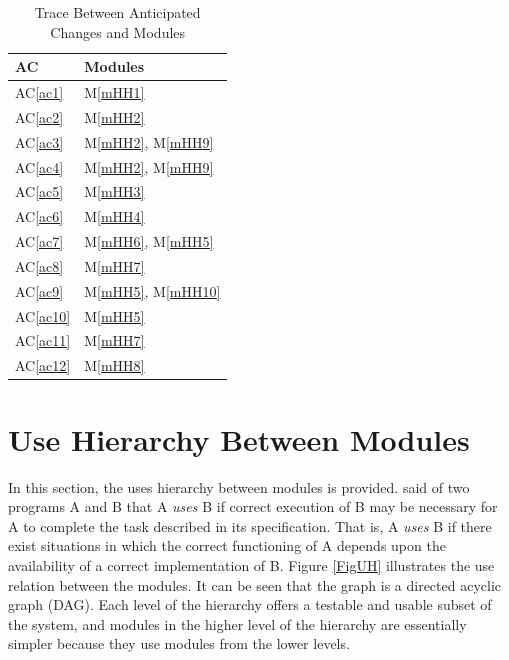 \documentclass[12pt, titlepage]{article}
\newcommand{\acref}[1]{AC\ref{#1}}
\newcommand{\mref}[1]{M\ref{#1}}
\begin{document}
\begin{table}[H]
  \centering
  \begin{tabular}{p{} p{}}
  \toprule
  \textbf{AC} & \textbf{Modules}\\
  \midrule
  \acref{ac1} & \mref{mHH1}\\
  \acref{ac2} & \mref{mHH2}\\
  \acref{ac3} & \mref{mHH2}, \mref{mHH9}\\
  \acref{ac4} & \mref{mHH2}, \mref{mHH9}\\
  \acref{ac5} & \mref{mHH3}\\
  \acref{ac6} & \mref{mHH4}\\
  \acref{ac7} & \mref{mHH6}, \mref{mHH5}\\
  \acref{ac8} & \mref{mHH7}\\
  \acref{ac9} & \mref{mHH5}, \mref{mHH10}\\
  \acref{ac10} & \mref{mHH5}\\
  \acref{ac11} & \mref{mHH7}\\
  \acref{ac12} & \mref{mHH8}\\
  \bottomrule
  \end{tabular}
  \caption{Trace Between Anticipated Changes and Modules}
  \label{TblACT}
  \end{table}
  

\section{Use Hierarchy Between Modules} \label{SecUse}

In this section, the uses hierarchy between modules is
provided. \citet{Parnas1978} said of two programs A and B that A {\em uses} B if
correct execution of B may be necessary for A to complete the task described in
its specification. That is, A {\em uses} B if there exist situations in which
the correct functioning of A depends upon the availability of a correct
implementation of B.  Figure \ref{FigUH} illustrates the use relation between
the modules. It can be seen that the graph is a directed acyclic graph
(DAG). Each level of the hierarchy offers a testable and usable subset of the
system, and modules in the higher level of the hierarchy are essentially simpler
because they use modules from the lower levels.
\end{document}
